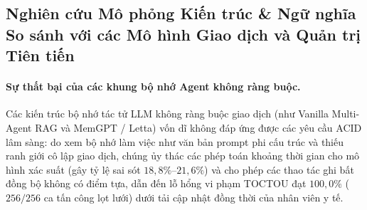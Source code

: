 \documentclass[11pt]{article}
\begin{document}
\subsection{Nghiên cứu Mô phỏng Kiến trúc \& Ngữ nghĩa So sánh với các Mô hình Giao dịch và Quản trị Tiên tiến}
\paragraph{Sự thất bại của các khung bộ nhớ Agent không ràng buộc.}
Các kiến trúc bộ nhớ tác tử LLM không ràng buộc giao dịch (như Vanilla Multi-Agent RAG và MemGPT / Letta) vốn dĩ không đáp ứng được các yêu cầu ACID lâm sàng: do xem bộ nhớ làm việc như văn bản prompt phi cấu trúc và thiếu ranh giới cô lập giao dịch, chúng ủy thác các phép toán khoảng thời gian cho mô hình xác suất (gây tỷ lệ sai sót $18{,}8\%$--$21{,}6\%$) và cho phép các thao tác ghi bất đồng bộ không có điểm tựa, dẫn đến lỗ hổng vi phạm TOCTOU đạt $100{,}0\%$ ($256/256$ ca tấn công lọt lưới) dưới tải cập nhật đồng thời của nhân viên y tế.
\end{document}
